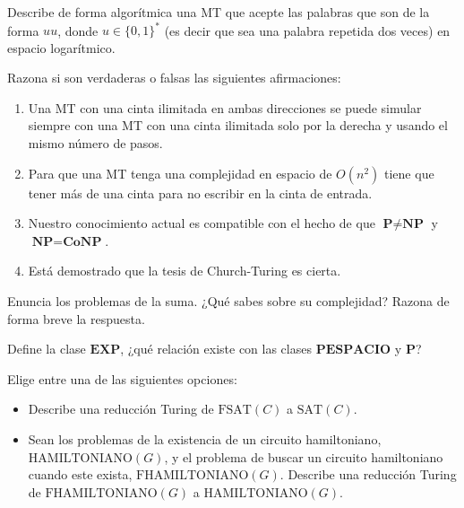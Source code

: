 \documentclass[12pt]{article}
\begin{document}
    \begin{ejercicio}[1.3 puntos]
        Describe de forma algorítmica una MT que acepte las palabras que son de la forma $uu$, donde $u \in \{0,1\}^{*}$ (es decir que sea una palabra repetida dos veces) en espacio logarítmico.
    \end{ejercicio}

    \begin{ejercicio}[2.4 puntos]
        Razona si son verdaderas o falsas las siguientes afirmaciones:

        \begin{enumerate}
            \item Una MT con una cinta ilimitada en ambas direcciones se puede simular siempre con una MT con una cinta ilimitada solo por la derecha y usando el mismo número de pasos.

            \item Para que una MT tenga una complejidad en espacio de $O(n^2)$ tiene que tener más de una cinta para no escribir en la cinta de entrada.

            \item Nuestro conocimiento actual es compatible con el hecho de que $\textbf{P} \neq \textbf{NP}$ y $\textbf{NP} = \textbf{CoNP}$.

            \item Está demostrado que la tesis de Church-Turing es cierta.
        \end{enumerate}
    \end{ejercicio}

    \begin{ejercicio}[1.3 puntos]
        Enuncia los problemas de la suma. ¿Qué sabes sobre su complejidad? Razona de forma breve la respuesta.
    \end{ejercicio}

    \begin{ejercicio}[1.3 puntos]
        Define la clase $\textbf{EXP}$, ¿qué relación existe con las clases $\textbf{PESPACIO}$ y $\textbf{P}$?
    \end{ejercicio}

    \begin{ejercicio}[1.3 puntos]
        Elige entre una de las siguientes opciones:

        \begin{itemize}
            \item Describe una reducción Turing de $\text{FSAT}(C)$ a $\text{SAT}(C)$.

            \item Sean los problemas de la existencia de un circuito hamiltoniano, $\text{HAMILTONIANO}(G)$, y el problema de buscar un circuito hamiltoniano 
            cuando este exista, $\text{FHAMILTONIANO}(G)$. Describe una reducción Turing de $\text{FHAMILTONIANO}(G)$ a $\text{HAMILTONIANO}(G)$.
        \end{itemize}
    \end{ejercicio}
\end{document}
